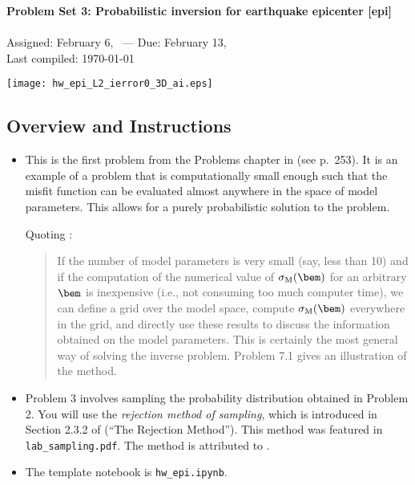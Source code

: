 \documentclass[11pt,titlepage,fleqn]{article}
\begin{document}

\begin{spacing}{1.2}
\centering
{\large \bf Problem Set 3: Probabilistic inversion for earthquake epicenter [epi]} \\
\cltag\ \\
Assigned: February 6, \cyear\ --- Due: February 13, \cyear\ \\
Last compiled: \today
\end{spacing}

\texttt{[image: hw\_epi\_L2\_ierror0\_3D\_ai.eps]}


\subsection*{Overview and Instructions}

\begin{itemize}
\item This is the first problem from the Problems chapter in \citet{Tarantola2005} (see p.~253). It is an example of a problem that is computationally small enough such that the misfit function can be evaluated almost anywhere in the space of model parameters. This allows for a purely probabilistic solution to the problem.

Quoting \citet[][p.~38]{Tarantola2005}:
\begin{quote}
If the number of model parameters is very small (say, less than 10) and if the computation of the numerical value of $\sigma_{\rm M}(\bem)$ for an arbitrary $\bem$ is inexpensive (i.e., not consuming too much computer time), we can define a grid over the model space, compute $\sigma_{\rm M}(\bem)$ everywhere in the grid, and directly use these results to discuss the information obtained on the model parameters. This is certainly the most general way of solving the inverse problem. Problem 7.1 gives an illustration of the method.
\end{quote}

\item Problem 3 involves sampling the probability distribution obtained in Problem 2. You will use the {\em rejection method of sampling}, which is introduced in Section 2.3.2 of \citet{Tarantola2005} (``The Rejection Method''). This method was featured in \verb+lab_sampling.pdf+. The method is attributed to \citet{vonNeumann1951}.

\item The template notebook is \verb+hw_epi.ipynb+.
%
\end{itemize}
\end{document}
